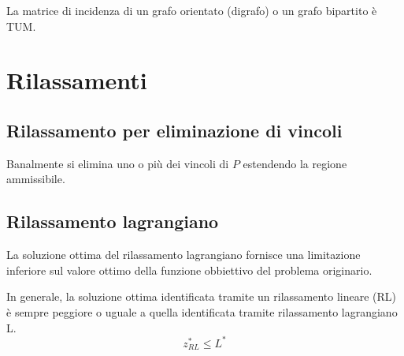 \documentclass[\main/main.tex]{subfiles}
\begin{document}
\begin{theorem}
  La matrice di incidenza di un grafo orientato (digrafo) o un grafo bipartito è TUM.
\end{theorem}

\section{Rilassamenti}
\subsection{Rilassamento per eliminazione di vincoli}
Banalmente si elimina uno o più dei vincoli di $P$ estendendo la regione ammissibile.

\subsection{Rilassamento lagrangiano}
La soluzione ottima del rilassamento lagrangiano fornisce una limitazione inferiore sul valore ottimo della funzione obbiettivo del problema originario.


\begin{theorem}
  In generale, la soluzione ottima identificata tramite un rilassamento lineare (RL) è sempre peggiore o uguale a quella identificata tramite rilassamento lagrangiano L.
  \[
    z^*_{RL} \leq L^*
  \]
\end{theorem}
\end{document}
